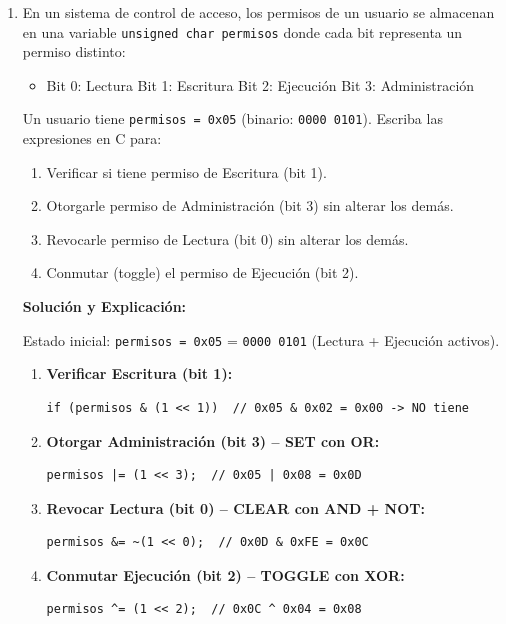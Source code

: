 \documentclass[11pt,letterpaper]{article}
\begin{document}
\begin{enumerate}[label=\textbf{\arabic*.}]
\begin{enumerate}[label=(\alph*)]
        \vspace{0.3cm}
        \item En un sistema de control de acceso, los permisos de un usuario se almacenan en una variable \texttt{unsigned char permisos} donde cada bit representa un permiso distinto:
        \begin{itemize}[noitemsep]
            \item Bit 0: Lectura \quad Bit 1: Escritura \quad Bit 2: Ejecución \quad Bit 3: Administración
        \end{itemize}
        Un usuario tiene \texttt{permisos = 0x05} (binario: \texttt{0000 0101}). Escriba las expresiones en C para:
        \begin{enumerate}[label=\arabic*., noitemsep]
            \item Verificar si tiene permiso de Escritura (bit 1).
            \item Otorgarle permiso de Administración (bit 3) sin alterar los demás.
            \item Revocarle permiso de Lectura (bit 0) sin alterar los demás.
            \item Conmutar (toggle) el permiso de Ejecución (bit 2).
        \end{enumerate}

        \begin{solucionbox}
        \textbf{Solución y Explicación:}

        \noindent Estado inicial: \texttt{permisos = 0x05} = \texttt{0000 0101} (Lectura + Ejecución activos).
        \begin{enumerate}[noitemsep]
            \item \textbf{Verificar Escritura (bit 1):}
            \begin{lstlisting}[style=customc, numbers=none]
if (permisos & (1 << 1))  // 0x05 & 0x02 = 0x00 -> NO tiene
            \end{lstlisting}
            \item \textbf{Otorgar Administración (bit 3) -- SET con OR:}
            \begin{lstlisting}[style=customc, numbers=none]
permisos |= (1 << 3);  // 0x05 | 0x08 = 0x0D
            \end{lstlisting}
            \item \textbf{Revocar Lectura (bit 0) -- CLEAR con AND + NOT:}
            \begin{lstlisting}[style=customc, numbers=none]
permisos &= ~(1 << 0);  // 0x0D & 0xFE = 0x0C
            \end{lstlisting}
            \item \textbf{Conmutar Ejecución (bit 2) -- TOGGLE con XOR:}
            \begin{lstlisting}[style=customc, numbers=none]
permisos ^= (1 << 2);  // 0x0C ^ 0x04 = 0x08
            \end{lstlisting}
        \end{enumerate}
        \end{solucionbox}
    \end{enumerate}
    \newpage

\end{enumerate}
\end{document}
